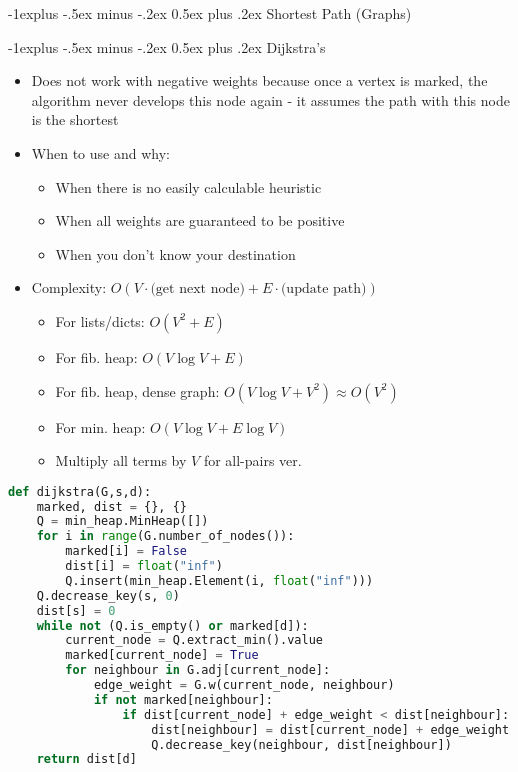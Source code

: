\documentclass[letterpaper, 8pt]{extarticle}
\makeatletter
\renewcommand{\section}{\@startsection{section}{1}{0mm}%
                                {-1explus -.5ex minus -.2ex}%
                                {0.5ex plus .2ex}%
                                {\normalfont\normalsize\bfseries}}
\renewcommand{\subsection}{\@startsection{subsection}{2}{0mm}%
                                {-1explus -.5ex minus -.2ex}%
                                {0.5ex plus .2ex}%
                                {\normalfont\small\bfseries}}
\makeatother
\begin{document}
\begin{multicols*}{5}

\section{Shortest Path (Graphs)}

\subsection{Dijkstra's}
\begin{itemize}
    \item Does not work with negative weights because once a vertex is marked, the algorithm never develops this node again - it assumes the path with this node is the shortest
    \item When to use and why:
    \begin{itemize}
        \item When there is no easily calculable heuristic
        \item When all weights are guaranteed to be positive
        \item When you don't know your destination
    \end{itemize}
    \item Complexity: $O(V\cdot\text{(get next node)} + E\cdot\text{(update path)})$
    \begin{itemize}
        \item For lists/dicts: $O(V^2 + E)$
        \item For fib. heap: $O(V \log V + E)$
        \item For fib. heap, dense graph: $O(V \log V + V^2) \approx O(V^2)$
        \item For min. heap: $O(V \log V + E \log V)$
        \item Multiply all terms by $V$ for all-pairs ver.
    \end{itemize}
\end{itemize}
\begin{lstlisting}[language=Python, breaklines=true, postbreak=\mbox{\textcolor{red}{$\hookrightarrow$}\space}]
def dijkstra(G,s,d):
    marked, dist = {}, {}
    Q = min_heap.MinHeap([])
    for i in range(G.number_of_nodes()):
        marked[i] = False
        dist[i] = float("inf")
        Q.insert(min_heap.Element(i, float("inf")))
    Q.decrease_key(s, 0)
    dist[s] = 0
    while not (Q.is_empty() or marked[d]):
        current_node = Q.extract_min().value
        marked[current_node] = True
        for neighbour in G.adj[current_node]:
            edge_weight = G.w(current_node, neighbour)
            if not marked[neighbour]:
                if dist[current_node] + edge_weight < dist[neighbour]:
                    dist[neighbour] = dist[current_node] + edge_weight
                    Q.decrease_key(neighbour, dist[neighbour])
    return dist[d]
    \end{lstlisting}



\end{multicols*}
\end{document}
